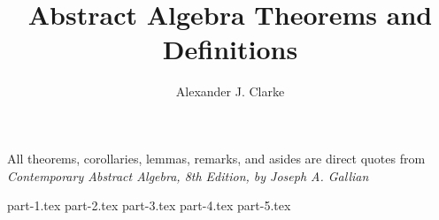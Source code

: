 \documentclass[12pt,letterpaper]{report}
\author{Alexander J. Clarke}
\title{Abstract Algebra Theorems and Definitions}
\begin{document}
\maketitle
\clearpage
\begin{center}
	\thispagestyle{empty}
	\vspace*{\fill}
	All theorems, corollaries, lemmas, remarks, and asides are direct quotes from\\

	\textit{Contemporary Abstract Algebra, 8th Edition, by Joseph A. Gallian}
	\vspace*{\fill}
\end{center}
\tableofcontents

{part-1.tex}
{part-2.tex}
{part-3.tex}
{part-4.tex}
{part-5.tex}
\end{document}
